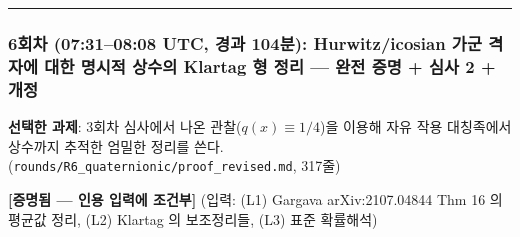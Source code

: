 \begin{center}\rule{0.5\linewidth}{0.5pt}\end{center}

\hypertarget{uxd68cuxcc28-07310808-utc-uxacbduxacfc-104uxbd84-hurwitzicosian-uxac00uxad70-uxaca9uxc790uxc5d0-uxb300uxd55c-uxba85uxc2dcuxc801-uxc0c1uxc218uxc758-klartag-uxd615-uxc815uxb9ac-uxc644uxc804-uxc99duxba85-uxc2ecuxc0ac-2-uxac1cuxc815}{%
\subsubsection*{6회차 (07:31--08:08 UTC, 경과 104분): Hurwitz/icosian 가군 격자에 대한 명시적 상수의 Klartag 형 정리 --- 완전 증명 + 심사 2 + 개정}\label{uxd68cuxcc28-07310808-utc-uxacbduxacfc-104uxbd84-hurwitzicosian-uxac00uxad70-uxaca9uxc790uxc5d0-uxb300uxd55c-uxba85uxc2dcuxc801-uxc0c1uxc218uxc758-klartag-uxd615-uxc815uxb9ac-uxc644uxc804-uxc99duxba85-uxc2ecuxc0ac-2-uxac1cuxc815}}

\textbf{선택한 과제}: 3회차 심사에서 나온 관찰(\(q(x)\equiv1/4\))을 이용해 자유 작용 대칭족에서 상수까지 추적한 엄밀한 정리를 쓴다. (\texttt{rounds/R6\_quaternionic/proof\_revised.md}, 317줄)

\textbf{{[}증명됨 --- 인용 입력에 조건부{]}} (입력: (L1) Gargava arXiv:2107.04844 Thm 16 의 평균값 정리, (L2) Klartag 의 보조정리들, (L3) 표준 확률해석)

